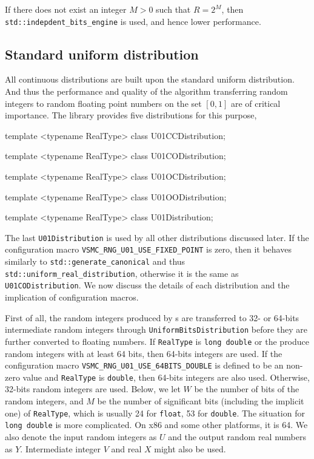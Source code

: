 If there does not exist an integer $M > 0$ such that $R = 2^M$, then
\verb|std::indepdent_bits_engine| is used, and hence lower performance.

\subsection{Standard uniform distribution}
\label{sub:Standard uniform distribution}

All continuous distributions are built upon the standard uniform distribution.
And thus the performance and quality of the algorithm transferring random
integers to random floating point numbers on the set $[0, 1]$ are of critical
importance. The library provides five distributions for this purpose,
\begin{cppcode}
  template <typename RealType>
  class U01CCDistribution;

  template <typename RealType>
  class U01CODistribution;

  template <typename RealType>
  class U01OCDistribution;

  template <typename RealType>
  class U01OODistribution;

  template <typename RealType>
  class U01Distribution;
\end{cppcode}
The last \verb|U01Distribution| is used by all other distributions discussed
later. If the configuration macro \verb|VSMC_RNG_U01_USE_FIXED_POINT| is zero,
then it behaves similarly to \verb|std::generate_canonical| and thus
\verb|std::uniform_real_distribution|, otherwise it is the same as
\verb|U01CODistribution|. We now discuss the details of each distribution and
the implication of configuration macros.

First of all, the random integers produced by \rng{}s are transferred to 32- or
64-bits intermediate random integers through \verb|UniformBitsDistribution|
before they are further converted to floating numbers. If \verb|RealType| is
\verb|long double| or the \rng{} produce random integers with at least 64 bits,
then 64-bits integers are used. If the configuration macro
\verb|VSMC_RNG_U01_USE_64BITS_DOUBLE| is defined to be an non-zero value and
\verb|RealType| is \verb|double|, then 64-bits integers are also used.
Otherwise, 32-bits random integers are used. Below, we let $W$ be the number of
bits of the random integers, and $M$ be the number of significant bits
(including the implicit one) of \verb|RealType|, which is usually 24 for
\verb|float|, 53 for \verb|double|. The situation for \verb|long double| is
more complicated. On x86 and some other platforms, it is 64. We also denote the
input random integers as $U$ and the output random real numbers as $Y$.
Intermediate integer $V$ and real $X$ might also be used.

